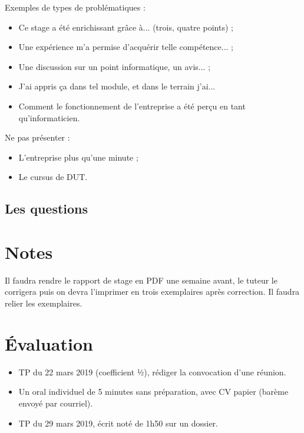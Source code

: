 \documentclass[final, a4paper, 11pt]{article}
\begin{document}
Exemples de types de problématiques :
\begin{itemize}
	\item Ce stage a été enrichissant grâce à... (trois, quatre points) ;
	\item Une expérience m'a permise d'acquérir telle compétence... ;
	\item Une discussion sur un point informatique, un avis... ;
	\item J'ai appris ça dans tel module, et dans le terrain j'ai...
	\item Comment le fonctionnement de l'entreprise a été perçu en tant qu'informaticien.
\end{itemize}

Ne pas présenter :
\begin{itemize}
	\item L'entreprise plus qu'une minute ;
	\item Le cursus de DUT.
\end{itemize}

\subsection{Les questions}


\section{Notes}
Il faudra rendre le rapport de stage en PDF une semaine avant, le tuteur le corrigera puis on devra l'imprimer en trois exemplaires après correction. Il faudra relier les exemplaires.

\section{Évaluation}
\begin{itemize}
	\item TP du 22 mars 2019 (coefficient ½), rédiger la convocation d'une réunion.
	\item Un oral individuel de 5 minutes sans préparation, avec CV papier (barème envoyé par courriel).
	\item TP du 29 mars 2019, écrit noté de 1h50 sur un dossier.
\end{itemize}
\end{document}
